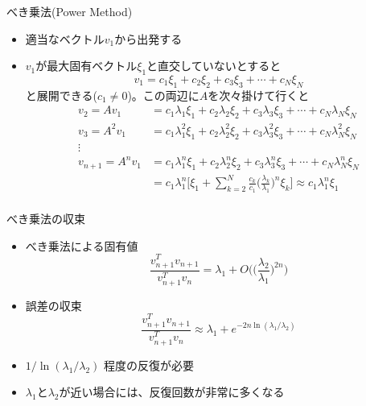 \documentclass[dvipdfmx]{beamer}
\begin{document}
\begin{frame}[t,fragile]{べき乗法(Power Method)}
  \begin{itemize}
  \item 適当なベクトル$v_1$から出発する
  \item $v_1$が最大固有ベクトル$\xi_1$と直交していないとすると
    \[
    v_1 = c_1 \xi_1 + c_2 \xi_2 + c_3 \xi_3 + \cdots + c_N \xi_N
    \]
    と展開できる($c_1 \ne 0$)。この両辺に$A$を次々掛けて行くと
    \begin{align*}
      v_2 = A v_1 &= c_1 \lambda_1 \xi_1 + c_2 \lambda_2 \xi_2 + c_3 \lambda_3 \xi_3 + \cdots + c_N \lambda_N \xi_N \\
      v_3 = A^2 v_1 &= c_1 \lambda_1^2 \xi_1 + c_2 \lambda_2^2 \xi_2 + c_3 \lambda_3^2 \xi_3 + \cdots + c_N \lambda_N^2 \xi_N \\
      \vdots \\
      v_{n+1} = A^n v_1 &= c_1 \lambda_1^n \xi_1 + c_2 \lambda_2^n \xi_2 + c_3 \lambda_3^n \xi_3 + \cdots + c_N \lambda_N^n \xi_N \\
      &= c_1 \lambda_1^n \Big[ \xi_1 + \sum_{k=2}^N \frac{c_k}{c_1} \big( \frac{\lambda_k}{\lambda_1}\big)^n \xi_k \Big] \approx c_1 \lambda_1^n \xi_1 \\
    \end{align*}
  \end{itemize}
\end{frame}

\begin{frame}[t,fragile]{べき乗法の収束}
  \begin{itemize}
    \setlength{\itemsep}{1em}
  \item べき乗法による固有値
    \[
    \frac{v_{n+1}^T v_{n+1}}{v_{n+1}^T v_n} = \lambda_1 + O\Big( \big(\frac{\lambda_2}{\lambda_1} \big)^{2n}\Big)
    \]
  \item 誤差の収束
    \[
    \frac{v_{n+1}^T v_{n+1}}{v_{n+1}^T v_n} \approx \lambda_1 + e^{-2n \ln (\lambda_1/\lambda_2)}
    \]
  \item $1 / \ln (\lambda_1/\lambda_2)$ 程度の反復が必要
  \item $\lambda_1$と$\lambda_2$が近い場合には、反復回数が非常に多くなる
  \end{itemize}
\end{frame}
\end{document}

